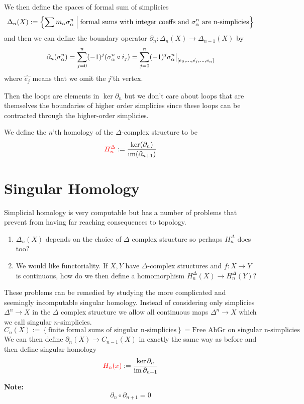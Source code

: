\documentclass[11pt]{article}
\newcommand{\defeq}{:=}
\DeclareMathOperator{\im}{\mathrm{im}}
\newcommand{\relmiddle}[1]{\mathrel{}\middle#1\mathrel{}}
\newcommand{\rmv}{\relmiddle|}
\newcommand\restr[2]{{%
  \left.\kern-\nulldelimiterspace %
  #1 %
  \vphantom{\big|} %
  \right|_{#2} %
  }}
\newenvironment{defin}
	{\begin{mdframed}[backgroundcolor=white, roundcorner=5pt, linewidth=1pt]}
	{\end{mdframed}}
\newcommand{\mdf}[1]{{\color{red} #1}}
\newenvironment{note}
	{\begin{mdframed}[backgroundcolor=white, linecolor=red, roundcorner=5pt, linewidth=1pt]\bfseries{Note:}\normalfont}
	{\end{mdframed}}
\begin{document}
We then define the spaces of formal sum of simplicies
\[
	\Delta_n(X)\defeq\left\{\sum m_\alpha\sigma_\alpha^n \rmv \text{formal sums with integer coeffs and }\\ \sigma_\alpha^n \text{ are n-simplicies}\right\}
\]
and then we can define the boundary operator $\partial_n:\Delta_n(X)\to\Delta_{n-1}(X)$ by 
\[
	\partial_n(\sigma_\alpha^n)=\sum_{j=0}^{n}(-1)^j(\sigma_\alpha^n \circ i_j) = \sum_{j=0}^{n}(-1)^j\restr{\sigma_\alpha^n}{[e_0, \dots, \hat{e_j}, \dots , e_n]}
\]
where $\hat{e_j}$ means that we omit the $j$'th vertex.

Then the loops are elements in $\ker\partial_n$ but we don't care about loops that are themselves the boundaries of higher order simplicies since these loops can be contracted through the higher-order simplicies.

\begin{defin}
	We define the $n$'th homology of the $\Delta$-complex structure to be
	\[
		\mdf{H_n^\Delta}\defeq\frac{\ker(\partial_n)}{\im(\partial_{n+1})}
	\]
\end{defin}

\section{Singular Homology}
Simplicial homology is very computable but has a number of problems that prevent from having far reaching consequences to topology.
\begin{enumerate}
	\item $\Delta_n(X)$ depends on the choice of $\Delta$ complex structure so perhaps $H_n^\Delta$ does too?
	\item We would like functoriality.
		If $X, Y$ have $\Delta$-complex structures and $f:X\to Y$ is continuous, how do we then define a homomorphism $H_n^\Delta(X)\to H_n^\Delta(Y)$?
\end{enumerate}

These problems can be remedied by studying the more complicated and seemingly incomputable singular homology.
Instead of considering only simplicies $\Delta^n\to X$ in the $\Delta$ complex structure we allow all continuous maps $\Delta^n\to X$ which we call \mdf{singular $n$-simplicies}.
\[
	C_n(X)\defeq\left\{\text{finite formal sums of singular n-simplicies}\right\}=\text{Free AbGr on singular n-simplicies}
\]
We can then define $\partial_n(X)\to C_{n-1}(X)$ in exactly the same way as before and then define \mdf{singular homology}
\[
	\mdf{H_n(x)}\defeq\frac{\ker\partial_n}{\im\partial_{n+1}}
\]
\begin{note}
	\[
		\partial_n\circ\partial_{n+1}=0
	\]
\end{note}
\end{document}
